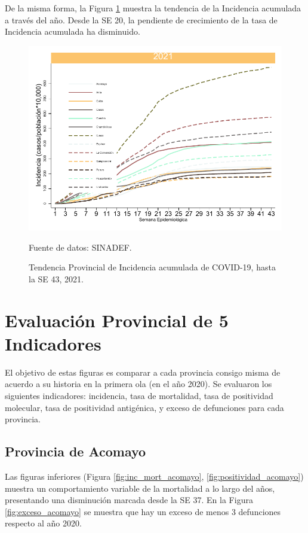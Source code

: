 \documentclass[12pt,a4paper,openany]{book}
\begin{document}
De la misma forma, la Figura \ref{fig:incidencia_provincial} muestra la tendencia de la Incidencia acumulada a través del año. Desde la SE 20, la pendiente de crecimiento de la tasa de Incidencia acumulada ha disminuido. 
\begin{figure}[h]
	\caption{Tendencia Provincial de Incidencia acumulada de COVID-19, hasta la SE 43, 2021. }\label{fig:incidencia_provincial}
	\begin{center}
		\includegraphics[width=0.5\linewidth]{../figuras/incidencia_provincial_2021.pdf}
	\end{center}
	{\footnotesize {Fuente de datos: SINADEF.}}
\end{figure}

\clearpage
	
\section*{Evaluación Provincial de 5 Indicadores}
		\noindent El objetivo de estas figuras es comparar a cada provincia consigo misma de acuerdo a su historia  en la primera ola (en el año 2020). Se evaluaron los siguientes indicadores: incidencia, tasa de mortalidad, tasa de positividad molecular, tasa de positividad antigénica, y exceso de defunciones para cada provincia.
		
		\subsection*{Provincia de Acomayo}
		\noindent Las figuras inferiores (Figura \ref{fig:inc_mort_acomayo}, \ref{fig:positividad_acomayo}) muestra un comportamiento variable de la mortalidad a lo largo del años, presentando una disminución marcada desde la SE 37. En la Figura \ref{fig:exceso_acomayo} se muestra que hay un exceso de menos 3 defunciones respecto al año 2020.
		
\end{document}
